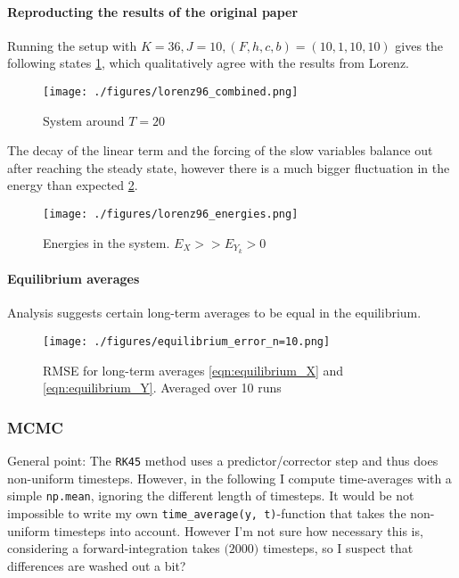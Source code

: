 \documentclass[11pt]{article}
\begin{document}
\paragraph{Reproducting the results of the original paper}
\label{sec:org8fe37ca}
Running the setup with \(K=36, J=10, (F, h, c, b) = (10, 1, 10, 10)\) gives the following states
\ref{fig:lorenz96_combined},
which qualitatively agree with the results from Lorenz.

\begin{figure}[htbp]
\centering
\texttt{[image: ./figures/lorenz96\_combined.png]}
\caption{\label{fig:lorenz96_combined}
System around \(T=20\)}
\end{figure}

The decay of the linear term and the forcing of the slow variables balance out after reaching the
steady state, however there is a much bigger fluctuation in the energy than expected \ref{fig:lorenz_energy}.

\begin{figure}[htbp]
\centering
\texttt{[image: ./figures/lorenz96\_energies.png]}
\caption{\label{fig:lorenz_energy}
Energies in the system. \(E_X >> E_{Y_k} > 0\)}
\end{figure}

\paragraph{Equilibrium averages}
\label{sec:org5335811}
Analysis suggests certain long-term averages to be equal in the equilibrium.

\begin{figure}[htbp]
\centering
\texttt{[image: ./figures/equilibrium\_error\_n=10.png]}
\caption{\label{fig:lorenz_rmse}
RMSE for long-term averages \ref{eqn:equilibrium_X} and \ref{eqn:equilibrium_Y}. Averaged over 10 runs}
\end{figure}

\subsubsection{MCMC}
\label{sec:orgf66e578}
General point: The \texttt{RK45} method uses a predictor/corrector step and thus does non-uniform timesteps.
However, in the following I compute time-averages with a simple \texttt{np.mean}, ignoring the different
length of timesteps. It would be not impossible to write my own \texttt{time\_average(y, t)}-function that
takes the non-uniform timesteps into account. However I'm not sure how necessary this is, considering
a forward-integration takes \(\mathcal(2000)\) timesteps, so I suspect that differences are washed out
a bit?
\end{document}
